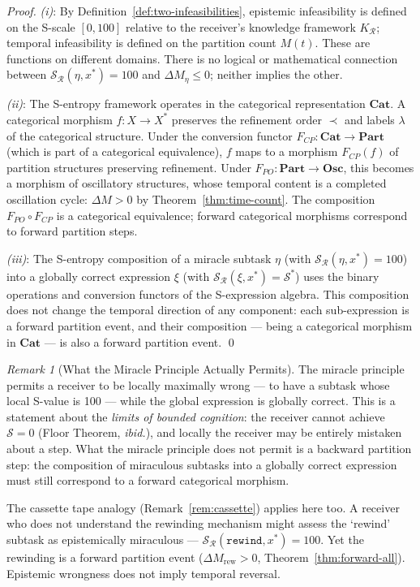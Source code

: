 \documentclass[twocolumn,10pt,a4paper]{article}
\theoremstyle{thmstyle}
\theoremstyle{definition}
\theoremstyle{remark}
\newtheorem{remark}[theorem]{Remark}
\begin{document}
\begin{proof}
\textit{(i)}: By Definition~\ref{def:two-infeasibilities}, epistemic infeasibility is defined on the S-scale $[0, 100]$ relative to the receiver's knowledge framework $K_{\mathcal{R}}$; temporal infeasibility is defined on the partition count $M(t)$. These are functions on different domains. There is no logical or mathematical connection between $\mathcal{S}_{\mathcal{R}}(\eta, x^{*}) = 100$ and $\Delta M_{\eta} \leq 0$; neither implies the other.

\textit{(ii)}: The S-entropy framework operates in the categorical representation $\mathbf{Cat}$. A categorical morphism $f : X \to X^{*}$ preserves the refinement order $\prec$ and labels $\lambda$ of the categorical structure. Under the conversion functor $F_{CP} : \mathbf{Cat} \to \mathbf{Part}$ (which is part of a categorical equivalence), $f$ maps to a morphism $F_{CP}(f)$ of partition structures preserving refinement. Under $F_{PO} : \mathbf{Part} \to \mathbf{Osc}$, this becomes a morphism of oscillatory structures, whose temporal content is a completed oscillation cycle: $\Delta M > 0$ by Theorem~\ref{thm:time-count}. The composition $F_{PO} \circ F_{CP}$ is a categorical equivalence; forward categorical morphisms correspond to forward partition steps.

\textit{(iii)}: The S-entropy composition of a miracle subtask $\eta$ (with $\mathcal{S}_{\mathcal{R}}(\eta, x^{*}) = 100$) into a globally correct expression $\xi$ (with $\mathcal{S}_{\mathcal{R}}(\xi, x^{*}) = \mathcal{S}^{*}$) uses the binary operations and conversion functors of the S-expression algebra. This composition does not change the temporal direction of any component: each sub-expression is a forward partition event, and their composition --- being a categorical morphism in $\mathbf{Cat}$ --- is also a forward partition event. \qed
\end{proof}

\begin{remark}[What the Miracle Principle Actually Permits]
\label{rem:miracle-clarified}
The miracle principle permits a receiver to be locally maximally wrong --- to have a subtask whose local S-value is 100 --- while the global expression is globally correct. This is a statement about the \emph{limits of bounded cognition}: the receiver cannot achieve $\mathcal{S} = 0$ (Floor Theorem, \textit{ibid.}), and locally the receiver may be entirely mistaken about a step. What the miracle principle does not permit is a backward partition step: the composition of miraculous subtasks into a globally correct expression must still correspond to a forward categorical morphism.

The cassette tape analogy (Remark~\ref{rem:cassette}) applies here too. A receiver who does not understand the rewinding mechanism might assess the `rewind' subtask as epistemically miraculous --- $\mathcal{S}_{\mathcal{R}}(\texttt{rewind}, x^{*}) = 100$. Yet the rewinding is a forward partition event ($\Delta M_{\mathrm{rew}} > 0$, Theorem~\ref{thm:forward-all}). Epistemic wrongness does not imply temporal reversal.
\end{remark}
\end{document}
